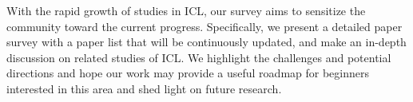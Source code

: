 
With the rapid growth of studies in ICL, our survey aims to sensitize the community toward the current progress.
Specifically, we present a detailed paper survey with a paper list that will be continuously updated, and make an in-depth discussion on related studies of ICL. We highlight the challenges and potential directions and hope our work may provide a useful roadmap for beginners interested in this area and shed light on future research.


